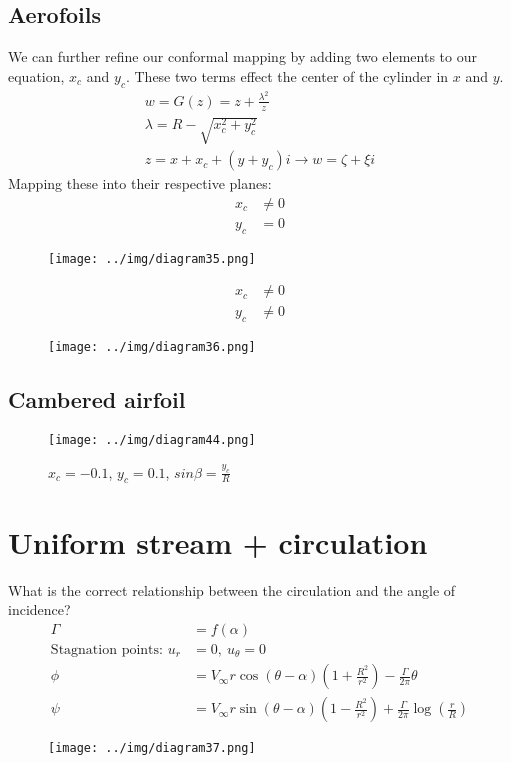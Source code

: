 \documentclass[class=report, crop=false, 12pt,a4paper]{standalone}
\begin{document}
\subsection{Aerofoils}
We can further refine our conformal mapping by adding two elements to our equation, $x_c$ and $y_c$. These two terms effect the center of the cylinder in $x$ and $y$. 
\begin{gather}
  w = G(z) = z + \frac{\lambda^2}{z}\\
  \lambda = R - \sqrt{x_c^2 + y_c^2}\\
  z = x + x_c + (y + y_c)i \rightarrow w = \zeta + \xi i
\end{gather}
Mapping these into their respective planes:
\begin{align}
  x_c &\neq 0\\
  y_c &= 0
\end{align}
\begin{figure}[H]
  \centering
  \texttt{[image: ../img/diagram35.png]}
\end{figure}
\begin{align}
  x_c &\neq 0\\
  y_c &\neq 0 
\end{align}
\begin{figure}[H]
  \centering
  \texttt{[image: ../img/diagram36.png]}
\end{figure}
\subsection{Cambered airfoil}
\begin{figure}[H]
  \centering
  \texttt{[image: ../img/diagram44.png]}
  \caption{$x_c = -0.1$, $y_c = 0.1$, $sin{\beta} = \frac{y_c}{R}$}
\end{figure}
\section{Uniform stream + circulation}
What is the correct relationship between the circulation and the angle of incidence?
\begin{align}
  \Gamma &= f(\alpha)\\
  \textrm{Stagnation points: } u_r &= 0, \ u_\theta = 0\\
  \phi &= V_\infty r \cos{(\theta - \alpha)}\left(1 + \frac{R^2}{r^2}\right) - \frac{\Gamma}{2\pi}\theta\\
  \psi &= V_\infty r \sin{(\theta - \alpha)}\left(1 - \frac{R^2}{r^2}\right) + \frac{\Gamma}{2\pi} \log{\left(\frac{r}{R}\right)}
\end{align}
\begin{figure}[H]
  \centering
  \texttt{[image: ../img/diagram37.png]}
\end{figure}
\end{document}
